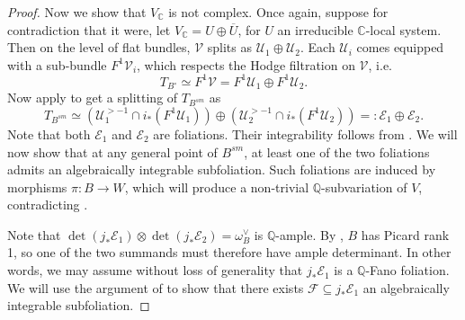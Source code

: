\documentclass[12pt]{amsart}
\newcommand{\Q}{\mathbb{Q}}
\newcommand{\C}{\mathbb{C}}
\theoremstyle{definition}
\theoremstyle{remark}
\numberwithin{equation}{section}
\begin{document}
\begin{proof}
Now we show that $V_\C$ is not complex. Once again, suppose for contradiction 
that it were, let $V_\C = U \oplus \overline{U}$, for $U$ an irreducible
$\C$-local system. Then on the level of flat bundles, $\mathcal{V}$ splits as
$\mathcal{U}_1 \oplus \mathcal{U}_2$. Each $\mathcal{U}_i$ comes equipped with a
sub-bundle $F^1\mathcal{V}_i$, which respects the Hodge filtration
on $\mathcal{V}$, i.e.
\begin{equation} \label{eq-tangent-bundle-local}
    T_{B^\circ} \simeq F^1 \mathcal{V} = F^1 \mathcal{U}_1 \oplus F^1 \mathcal{U}_2.
\end{equation}
Now apply  to get a splitting of \(T_{B^{sm}}\) as
\begin{equation}
    T_{B^{sm}} \simeq \left(\mathcal{U}_1^{>-1} \cap i_*(F^1 \mathcal{U}_1) \right)
    \oplus \left(\mathcal{U}_2^{>-1} \cap i_*(F^1 \mathcal{U}_2)\right)
    =: \mathcal{E}_1 \oplus \mathcal{E}_2.
\end{equation}
Note that both \(\mathcal{E}_1\) and \(\mathcal{E}_2\) are foliations. Their 
integrability follows from \cite[Lemma 3.3]{bak-sch23}. We will now show that 
at any general point of \(B^{sm}\), at least one of the two foliations admits an
algebraically integrable subfoliation. Such foliations are induced by morphisms 
\(\pi: B \to W\), which will produce a non-trivial \(\Q\)-subvariation 
of \(V\), contradicting .

Note that \(\det (j_* \mathcal{E}_1) \otimes \det (j_* \mathcal{E}_2) = 
\omega_{B}^{\vee}\) is \(\Q\)-ample. By \cite[Theorem 1.1]{mats15}, \(B\) has 
Picard rank 1, so one of the two summands must therefore have ample determinant.
In other words, we may assume without loss of generality that \(j_* \mathcal{E}_1\)
is a \(\Q\)-Fano foliation. We will use the argument of
\cite[Corollary 2.12]{araujo18} to show that there exists
\(\mathcal{F} \subseteq j_* \mathcal{E}_1\) an algebraically integrable subfoliation.


\end{proof}
\end{document}
